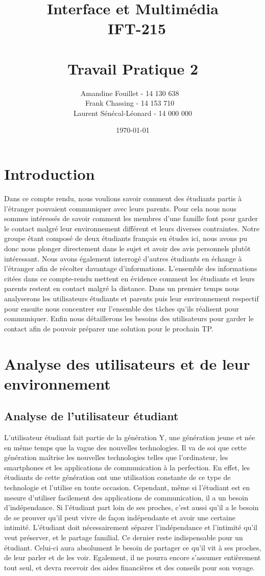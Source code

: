\documentclass[12pt]{article}
\title{\vspace{\fill} Interface et Multimédia \\ ~\textbf{IFT-215} \\~\\ Travail Pratique 2}
\author{Amandine Fouillet - 14 130 638 ~\\ Frank Chassing - 14 153 710 ~\\ Laurent Sénécal-Léonard - 14 000 000}
\date{\today \vspace{\fill}}
\begin{document}
\maketitle
\newpage

\tableofcontents
\newpage
\section{Introduction}

Dans ce compte rendu, nous voulions savoir comment des étudiants partis à l’étranger pouvaient communiquer avec leurs parents. Pour cela nous nous sommes intéressés de savoir comment les membres d’une famille font pour garder le contact malgré leur environnement différent et leurs diverses contraintes. Notre groupe étant composé de deux étudiants français en études ici, nous avons pu donc nous plonger directement dans le sujet et avoir des avis personnels plutôt intéressant. Nous avons également interrogé d’autres étudiants en échange à l’étranger afin de récolter davantage d’informations. L’ensemble des informations citées dans ce compte-rendu mettent en évidence comment les étudiants et leurs parents restent en contact malgré la distance. Dans un premier temps nous analyserons les utilisateurs étudiants et parents puis leur environnement respectif pour ensuite nous concentrer sur l’ensemble des tâches qu’ils réalisent pour communiquer. Enfin nous détaillerons les besoins des utilisateurs pour garder le contact afin de pouvoir préparer une solution pour le prochain TP. 


\section{Analyse des utilisateurs et de leur environnement}

\subsection{Analyse de l’utilisateur étudiant}

L’utilisateur étudiant fait partie de la génération Y, une génération jeune et née en même temps que la vague des nouvelles technologies. Il va de soi que cette génération maîtrise les nouvelles technologies telles que l’ordinateur, les smartphones et les applications de communication à la perfection.  En effet, les étudiants de cette génération ont une utilisation constante de ce type de technologie et l’utilise en toute occasion. Cependant, même si l’étudiant est en mesure d’utiliser facilement des applications de communication, il a un besoin d’indépendance. Si l’étudiant part loin de ses proches, c’est aussi qu’il a le besoin de se prouver qu’il peut vivre de façon indépendante et avoir une certaine intimité. L’étudiant doit nécessairement séparer l’indépendance et l’intimité qu’il veut préserver, et  le partage familial. Ce dernier reste indispensable pour un étudiant. Celui-ci aura absolument le besoin de partager ce qu’il vit à ses proches, de leur parler et de les voir.  Egalement, il ne pourra encore s’assumer entièrement tout seul, et devra recevoir des aides financières et des conseils pour son voyage.
\end{document}
